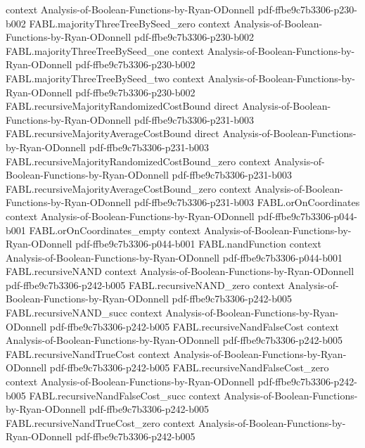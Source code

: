 \begin{theorem}
  {context}
  {Analysis-of-Boolean-Functions-by-Ryan-ODonnell}
  {pdf-ffbe9c7b3306-p230-b002}
\proofstep
  {FABL.majorityThreeTreeBySeed_zero}
  {context}
  {Analysis-of-Boolean-Functions-by-Ryan-ODonnell}
  {pdf-ffbe9c7b3306-p230-b002}
\proofstep
  {FABL.majorityThreeTreeBySeed_one}
  {context}
  {Analysis-of-Boolean-Functions-by-Ryan-ODonnell}
  {pdf-ffbe9c7b3306-p230-b002}
\proofstep
  {FABL.majorityThreeTreeBySeed_two}
  {context}
  {Analysis-of-Boolean-Functions-by-Ryan-ODonnell}
  {pdf-ffbe9c7b3306-p230-b002}
\proofstep
  {FABL.recursiveMajorityRandomizedCostBound}
  {direct}
  {Analysis-of-Boolean-Functions-by-Ryan-ODonnell}
  {pdf-ffbe9c7b3306-p231-b003}
\proofstep
  {FABL.recursiveMajorityAverageCostBound}
  {direct}
  {Analysis-of-Boolean-Functions-by-Ryan-ODonnell}
  {pdf-ffbe9c7b3306-p231-b003}
\proofstep
  {FABL.recursiveMajorityRandomizedCostBound_zero}
  {context}
  {Analysis-of-Boolean-Functions-by-Ryan-ODonnell}
  {pdf-ffbe9c7b3306-p231-b003}
\proofstep
  {FABL.recursiveMajorityAverageCostBound_zero}
  {context}
  {Analysis-of-Boolean-Functions-by-Ryan-ODonnell}
  {pdf-ffbe9c7b3306-p231-b003}
\proofstep
  {FABL.orOnCoordinates}
  {context}
  {Analysis-of-Boolean-Functions-by-Ryan-ODonnell}
  {pdf-ffbe9c7b3306-p044-b001}
\proofstep
  {FABL.orOnCoordinates_empty}
  {context}
  {Analysis-of-Boolean-Functions-by-Ryan-ODonnell}
  {pdf-ffbe9c7b3306-p044-b001}
\proofstep
  {FABL.nandFunction}
  {context}
  {Analysis-of-Boolean-Functions-by-Ryan-ODonnell}
  {pdf-ffbe9c7b3306-p044-b001}
\proofstep
  {FABL.recursiveNAND}
  {context}
  {Analysis-of-Boolean-Functions-by-Ryan-ODonnell}
  {pdf-ffbe9c7b3306-p242-b005}
\proofstep
  {FABL.recursiveNAND_zero}
  {context}
  {Analysis-of-Boolean-Functions-by-Ryan-ODonnell}
  {pdf-ffbe9c7b3306-p242-b005}
\proofstep
  {FABL.recursiveNAND_succ}
  {context}
  {Analysis-of-Boolean-Functions-by-Ryan-ODonnell}
  {pdf-ffbe9c7b3306-p242-b005}
\proofstep
  {FABL.recursiveNandFalseCost}
  {context}
  {Analysis-of-Boolean-Functions-by-Ryan-ODonnell}
  {pdf-ffbe9c7b3306-p242-b005}
\proofstep
  {FABL.recursiveNandTrueCost}
  {context}
  {Analysis-of-Boolean-Functions-by-Ryan-ODonnell}
  {pdf-ffbe9c7b3306-p242-b005}
\proofstep
  {FABL.recursiveNandFalseCost_zero}
  {context}
  {Analysis-of-Boolean-Functions-by-Ryan-ODonnell}
  {pdf-ffbe9c7b3306-p242-b005}
\proofstep
  {FABL.recursiveNandFalseCost_succ}
  {context}
  {Analysis-of-Boolean-Functions-by-Ryan-ODonnell}
  {pdf-ffbe9c7b3306-p242-b005}
\proofstep
  {FABL.recursiveNandTrueCost_zero}
  {context}
  {Analysis-of-Boolean-Functions-by-Ryan-ODonnell}
  {pdf-ffbe9c7b3306-p242-b005}

\end{theorem}
